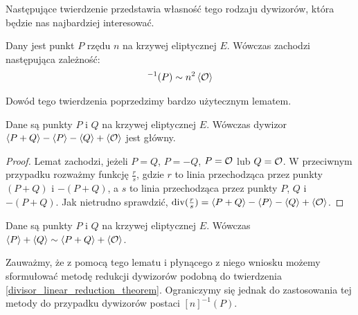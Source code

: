 \noindent
Następujące twierdzenie przedstawia własność tego rodzaju dywizorów,
która będzie nas najbardziej interesować.

\begin{theorem}\label{point_division_divisor_principle_theorem}
Dany jest punkt $P$ rzędu $n$ na krzywej eliptycznej $E$.
Wówczas zachodzi następująca zależność:
\begin{eqnarray*}
[n]^{-1}(P) \sim n^2\divi{\ecident}
\end{eqnarray*}
\end{theorem}

\noindent
Dowód tego twierdzenia poprzedzimy bardzo użytecznym lematem.

\begin{lemma}\label{divi_reduction_lemma}
Dane są punkty $P$ i $Q$ na krzywej eliptycznej $E$.
Wówczas dywizor $\left\langle P+Q\right\rangle - \left\langle P\right\rangle - \left\langle Q\right\rangle + \left\langle\mathcal{O}\right\rangle$
jest główny.
\end{lemma}

\begin{proof}
Lemat zachodzi, jeżeli $P = Q$, $P = -Q$, $P = \mathcal{O}$ lub $Q = \mathcal{O}$.
W przeciwnym przypadku rozważmy funkcję $\frac{r}{s}$,
gdzie $r$ to linia przechodząca przez punkty $(P+Q)$ i $-(P+Q)$,
a $s$ to linia przechodząca przez punkty $P$, $Q$ i $-(P+Q)$.
Jak nietrudno sprawdzić,
$\operatorname{div}(\frac{r}{s}) = \left\langle P+Q\right\rangle - \left\langle P\right\rangle - \left\langle Q\right\rangle + \left\langle\mathcal{O}\right\rangle$.
\end{proof}

\begin{corollary}\label{divi_sum_reduction_coro}
Dane są punkty $P$ i $Q$ na krzywej eliptycznej $E$.
Wówczas $\left\langle P\right\rangle + \left\langle Q\right\rangle \sim \left\langle P+Q\right\rangle + \left\langle\mathcal{O}\right\rangle$.
\end{corollary}

\noindent
Zauważmy, że z pomocą tego lematu i płynącego z niego wniosku
możemy sformułować metodę redukcji dywizorów
podobną do twierdzenia \ref{divisor_linear_reduction_theorem}.
Ograniczymy się jednak do zastosowania tej metody
do przypadku dywizorów postaci $[n]^{-1}(P)$.

